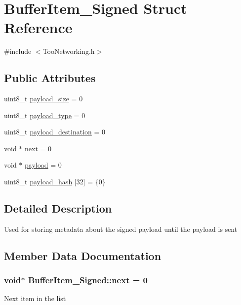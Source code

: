 \hypertarget{structBufferItem__Signed}{}\section{Buffer\+Item\+\_\+\+Signed Struct Reference}
\label{structBufferItem__Signed}


{\ttfamily \#include $<$Too\+Networking.\+h$>$}

\subsection*{Public Attributes}
\begin{DoxyCompactItemize}
\item 
uint8\+\_\+t \hyperlink{structBufferItem__Signed_a99af0ec40a5d44a11df8592667fe7614}{payload\+\_\+size} = 0
\item 
uint8\+\_\+t \hyperlink{structBufferItem__Signed_a75a67331ae70b15b59ba8941313e4fce}{payload\+\_\+type} = 0
\item 
uint8\+\_\+t \hyperlink{structBufferItem__Signed_ad71dae240fb681bedb0c0332fff403fe}{payload\+\_\+destination} = 0
\item 
void $\ast$ \hyperlink{structBufferItem__Signed_afd4c3d25479c65a1b34d430d8d0372c3}{next} = 0
\item 
void $\ast$ \hyperlink{structBufferItem__Signed_a4f268b032fb161b2c73daad2d2659291}{payload} = 0
\item 
uint8\+\_\+t \hyperlink{structBufferItem__Signed_aea55c4b9fa78da421de8f83df370fb57}{payload\+\_\+hash} \mbox{[}32\mbox{]} = \{0\}
\end{DoxyCompactItemize}


\subsection{Detailed Description}
Used for storing metadata about the signed payload until the payload is sent 

\subsection{Member Data Documentation}
\subsubsection[{\texorpdfstring{next}{next}}]{\setlength{\rightskip}{0pt plus 5cm}void$\ast$ Buffer\+Item\+\_\+\+Signed\+::next = 0}\hypertarget{structBufferItem__Signed_afd4c3d25479c65a1b34d430d8d0372c3}{}\label{structBufferItem__Signed_afd4c3d25479c65a1b34d430d8d0372c3}
Next item in the list 
